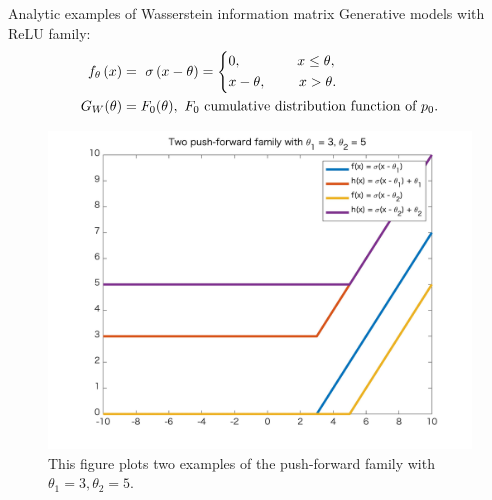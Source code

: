 \documentclass{beamer}
\begin{document}
\begin{frame}{Analytic examples of Wasserstein information matrix}
    Generative models with ReLU family:
        \begin{equation*}
            \begin{aligned}
                f_{\theta} \left( x \right) & = \ \sigma\left( x - \theta \right) = \left\{
        		\begin{aligned}
        		& 0, \qquad \qquad x \leq \theta,			\\
        		& x - \theta, \ \qquad x > \theta.
        		\end{aligned}\right.      \\
                G_W(\theta) & = F_0(\theta), \ F_0 \text{ cumulative distribution function of } p_0.
            \end{aligned}
        \end{equation*}
        \begin{figure}[H]
          \centering
          \centerline{\includegraphics[width=0.5\linewidth]{ReLU.jpg}}
          \caption{This figure plots two examples of the push-forward family with $\theta_1 = 3, \theta_2 = 5$.}
        \end{figure}
\end{frame}
\end{document}
